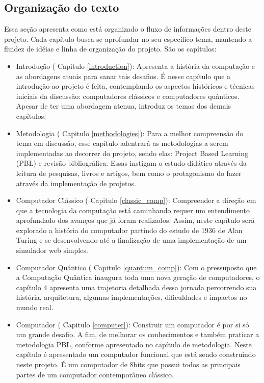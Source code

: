 \subsection{Organização do texto}
Essa seção apresenta como está organizado o fluxo de informações dentro deste projeto. Cada capítulo busca se aprofundar no seu específico tema, mantendo a fluidez de idéias e linha de organização do projeto. São os capítulos:

\begin{itemize}
  \item Introdução ( Capitulo \ref{introduction}): Apresenta a história da computação e as abordagens atuais para sanar tais desafios. É nesse capítulo que a introdução ao projeto é feita, contemplando os aspectos históricos e técnicas iniciais da discussão: computadores clássicos e computadores quânticos. Apesar de ter uma abordagem atenua, introduz os temas dos demais capítulos;
  \item Metodologia ( Capitulo \ref{methodologies}): Para a melhor compreensão do tema em discussão, esse capítulo adentrará as metodologias a serem implementadas ao decorrer do projeto, sendo elas: Project Based Learning (PBL) e revisão bibliográfica. Essas instigam o estudo didático através da leitura de pesquisas, livros e artigos, bem como o protagonismo do fazer através da implementação de projetos.
  \item Computador Clássico ( Capitulo \ref{classic_comp}): Compreender a direção em que a tecnologia da computação está caminhando requer um entendimento aprofundado dos avanços que já foram realizados. Assim, neste capítulo será explorado a história do computador partindo do estudo de 1936 de Alan Turing e se desenvolvendo até a finalização de uma implementação de um simulador web simples.
  \item Computador Quântico ( Capitulo \ref{quantum_comp}): Com o pressuposto que a Computação Quântica inaugura toda uma nova geração de computadores, o capítulo 4 apresenta uma trajetoria detalhada dessa jornada percorrendo sua história, arquitetura, algumas implementações, dificuldades e impactos no mundo real.
  \item Computador ( Capitulo \ref{computer}): Construir um computador é por si só um grande desafio. A fim, de melhorar os conhecimentos e também praticar a metodologia PBL, conforme apresentado no capítulo de metodologia. Neste capítulo é apresentado um computador funcional que está sendo construindo neste projeto. É um computador de 8bits que possui todos as principais partes de um computador contemporâneo clássico.

\end{itemize}
